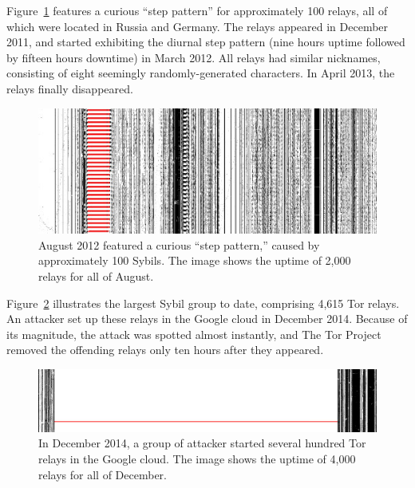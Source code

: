 Figure~\ref{fig:2012-08-steppattern} features a curious ``step pattern'' for
approximately 100 relays, all of which were located in Russia and Germany.  The
relays appeared in December 2011, and started exhibiting the diurnal step
pattern (nine hours uptime followed by fifteen hours downtime) in March 2012.
All relays had similar nicknames, consisting of eight seemingly
randomly-generated characters.  In April 2013, the relays finally disappeared.

\begin{figure}[t]
	\centering
	\includegraphics[width=\linewidth]{diagrams/2012-08.jpg}
	\caption{August 2012 featured a curious ``step pattern,'' caused by
	approximately 100 Sybils.  The image shows the uptime of 2,000 relays for
	all of August.}
	\label{fig:2012-08-steppattern}
\end{figure}

Figure~\ref{fig:2014-12-lizard} illustrates the largest Sybil group to date,
comprising 4,615 Tor relays.  An attacker set up these relays in the Google
cloud in December 2014.  Because of its magnitude, the attack was spotted
almost instantly, and The Tor Project removed the offending relays only ten
hours after they appeared.

\begin{figure}[t]
	\centering
	\includegraphics[width=\linewidth]{diagrams/2014-12.jpg}
	\caption{In December 2014, a group of attacker started several hundred Tor
		relays in the Google cloud.  The image shows the uptime of 4,000 relays
		for all of December.}
	\label{fig:2014-12-lizard}
\end{figure}

